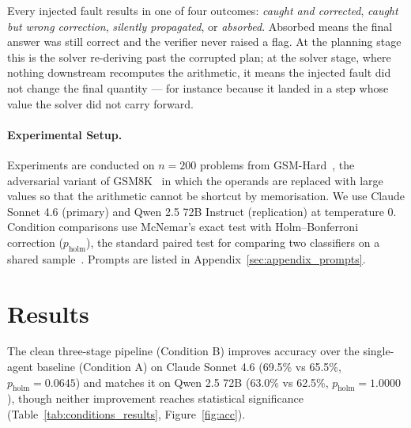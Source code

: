 \documentclass[11pt]{article}
\begin{document}
Every injected fault results in one of four outcomes: \emph{caught and corrected}, \emph{caught but wrong correction}, \emph{silently propagated}, or \emph{absorbed}. Absorbed means the final answer was still correct and the verifier never raised a flag. At the planning stage this is the solver re-deriving past the corrupted plan; at the solver stage, where nothing downstream recomputes the arithmetic, it means the injected fault did not change the final quantity --- for instance because it landed in a step whose value the solver did not carry forward.

\paragraph{Experimental Setup.} Experiments are conducted on $n=200$ problems from GSM-Hard~\citep{gao2023pal}, the adversarial variant of GSM8K~\citep{cobbe2021gsm8k} in which the operands are replaced with large values so that the arithmetic cannot be shortcut by memorisation. We use Claude Sonnet 4.6 (primary) and Qwen 2.5 72B Instruct (replication) at temperature 0. Condition comparisons use McNemar's exact test with Holm--Bonferroni correction ($p_{\mathrm{holm}}$), the standard paired test for comparing two classifiers on a shared sample~\citep{dietterich1998approximate}. Prompts are listed in Appendix~\ref{sec:appendix_prompts}.

\section{Results}

The clean three-stage pipeline (Condition B) improves accuracy over the single-agent baseline (Condition A) on Claude Sonnet 4.6 (69.5\% vs 65.5\%, $p_{\mathrm{holm}} = 0.0645$) and matches it on Qwen 2.5 72B (63.0\% vs 62.5\%, $p_{\mathrm{holm}} = 1.0000$), though neither improvement reaches statistical significance (Table~\ref{tab:conditions_results}, Figure~\ref{fig:acc}).
\end{document}
